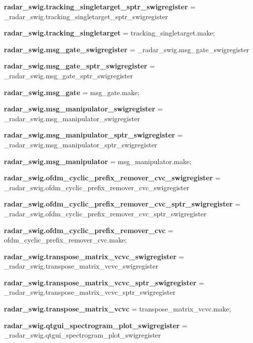 \begin{DoxyCompactItemize}
{\bf radar\+\_\+swig.\+tracking\+\_\+singletarget\+\_\+sptr\+\_\+swigregister} = \+\_\+radar\+\_\+swig.\+tracking\+\_\+singletarget\+\_\+sptr\+\_\+swigregister
\item 
{\bf radar\+\_\+swig.\+tracking\+\_\+singletarget} = tracking\+\_\+singletarget.\+make;
\item 
{\bf radar\+\_\+swig.\+msg\+\_\+gate\+\_\+swigregister} = \+\_\+radar\+\_\+swig.\+msg\+\_\+gate\+\_\+swigregister
\item 
{\bf radar\+\_\+swig.\+msg\+\_\+gate\+\_\+sptr\+\_\+swigregister} = \+\_\+radar\+\_\+swig.\+msg\+\_\+gate\+\_\+sptr\+\_\+swigregister
\item 
{\bf radar\+\_\+swig.\+msg\+\_\+gate} = msg\+\_\+gate.\+make;
\item 
{\bf radar\+\_\+swig.\+msg\+\_\+manipulator\+\_\+swigregister} = \+\_\+radar\+\_\+swig.\+msg\+\_\+manipulator\+\_\+swigregister
\item 
{\bf radar\+\_\+swig.\+msg\+\_\+manipulator\+\_\+sptr\+\_\+swigregister} = \+\_\+radar\+\_\+swig.\+msg\+\_\+manipulator\+\_\+sptr\+\_\+swigregister
\item 
{\bf radar\+\_\+swig.\+msg\+\_\+manipulator} = msg\+\_\+manipulator.\+make;
\item 
{\bf radar\+\_\+swig.\+ofdm\+\_\+cyclic\+\_\+prefix\+\_\+remover\+\_\+cvc\+\_\+swigregister} = \+\_\+radar\+\_\+swig.\+ofdm\+\_\+cyclic\+\_\+prefix\+\_\+remover\+\_\+cvc\+\_\+swigregister
\item 
{\bf radar\+\_\+swig.\+ofdm\+\_\+cyclic\+\_\+prefix\+\_\+remover\+\_\+cvc\+\_\+sptr\+\_\+swigregister} = \+\_\+radar\+\_\+swig.\+ofdm\+\_\+cyclic\+\_\+prefix\+\_\+remover\+\_\+cvc\+\_\+sptr\+\_\+swigregister
\item 
{\bf radar\+\_\+swig.\+ofdm\+\_\+cyclic\+\_\+prefix\+\_\+remover\+\_\+cvc} = ofdm\+\_\+cyclic\+\_\+prefix\+\_\+remover\+\_\+cvc.\+make;
\item 
{\bf radar\+\_\+swig.\+transpose\+\_\+matrix\+\_\+vcvc\+\_\+swigregister} = \+\_\+radar\+\_\+swig.\+transpose\+\_\+matrix\+\_\+vcvc\+\_\+swigregister
\item 
{\bf radar\+\_\+swig.\+transpose\+\_\+matrix\+\_\+vcvc\+\_\+sptr\+\_\+swigregister} = \+\_\+radar\+\_\+swig.\+transpose\+\_\+matrix\+\_\+vcvc\+\_\+sptr\+\_\+swigregister
\item 
{\bf radar\+\_\+swig.\+transpose\+\_\+matrix\+\_\+vcvc} = transpose\+\_\+matrix\+\_\+vcvc.\+make;
\item 
{\bf radar\+\_\+swig.\+qtgui\+\_\+spectrogram\+\_\+plot\+\_\+swigregister} = \+\_\+radar\+\_\+swig.\+qtgui\+\_\+spectrogram\+\_\+plot\+\_\+swigregister

\end{DoxyCompactItemize}
